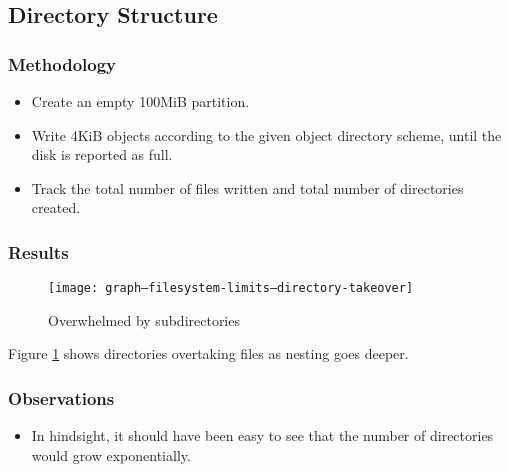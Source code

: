\documentclass[a4paper]{article}
\begin{document}
\subsection{Directory Structure}

\subsubsection{Methodology}

\begin{itemize}

  \item Create an empty 100MiB partition.

  \item Write 4KiB objects according to the given object directory scheme, until
    the disk is reported as full.

  \item Track the total number of files written and total number of directories
    created.

\end{itemize}

\subsubsection{Results}

\begin{figure}[p]
  \caption{Overwhelmed by subdirectories}
  \label{fig:graph--filesystem-limits--directory-takeover}
  \centering
    \texttt{[image: graph--filesystem-limits--directory-takeover]}
\end{figure}

Figure \ref{fig:graph--filesystem-limits--directory-takeover} shows directories
overtaking files as nesting goes deeper.

\subsubsection{Observations}

\begin{itemize}

  \item In hindsight, it should have been easy to see that the number of
    directories would grow exponentially.

\end{itemize}
\end{document}
